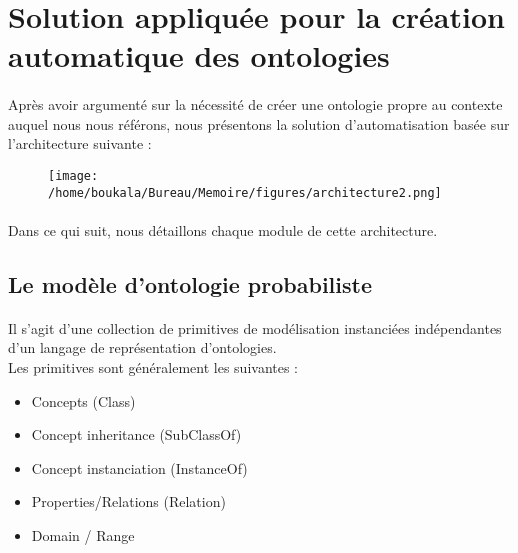 \documentclass[12pt, a4paper, oneside]{book}
\begin{document}
\section{Solution appliquée pour la création automatique des ontologies}
\paragraph{}
Après avoir argumenté sur la nécessité de créer une ontologie propre au contexte auquel nous nous référons, nous présentons la solution d'automatisation basée sur l'architecture suivante : 

\begin{figure}[h!]
\begin{center}
\texttt{[image: /home/boukala/Bureau/Memoire/figures/architecture2.png]}
\end{center}
\end{figure}



 
\paragraph{}
Dans ce qui suit, nous détaillons chaque module de cette architecture.

\subsection{Le modèle d'ontologie probabiliste}

\paragraph{}
Il s'agit d'une collection de primitives de modélisation instanciées indépendantes d'un langage de représentation d'ontologies.\\
Les primitives sont généralement les suivantes : \\ 
\begin{itemize}

\item Concepts (Class)\\
\item Concept inheritance (SubClassOf)\\
\item Concept instanciation (InstanceOf)\\
\item Properties/Relations (Relation)\\
\item Domain / Range\\

\end{itemize}
\end{document}
